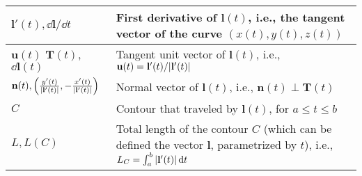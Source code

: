 \begin{xltabular}{\textwidth}{XX}
	\(\mathbf{l}'(t), \dd{\mathbf{l}}/\dd{t}\)                                                                                                                                                                                                 & First derivative of \(\mathbf{l}(t)\), i.e., the tangent vector of the curve \((x(t), y(t), z(t))\) \cite{stewartCalculus2011}                                                                                                                                                                                                      \\ \hline
	\(\mathbf{u}(t)\)\cite{kreyszigAdvancedEngineeringMathematics2008} \(\mathbf{T}(t)\)\cite{stewartCalculus2011}, \(\dd{\mathbf{l}}(t)\)\cite{ramoFieldsWavesCommunication1994}                                                                   & Tangent unit vector of \(\mathbf{l}(t)\), i.e., \newline  \(\mathbf{u}(t) = \mathbf{l}'(t)/\abs{\mathbf{l}'(t)}\) \\ \hline
	\(\mathbf{n}(t), \left( \frac{y'(t)}{\abs{\mathbf{l}'(t)}}, -\frac{x'(t)}{\abs{\mathbf{l}'(t)}} \right)\)                                                                                                                                  & Normal vector of \(\mathbf{l}(t)\), i.e., \newline \(\mathbf{n}(t)\perp \mathbf{T}(t) \)\cite{stewartCalculus2011}                                                                                                                                                                                                                  \\ \hline
	\(C\)                                                                                                                                                                                                                                      & Contour that traveled by \(\mathbf{l}(t)\), for \(a \leq t \leq b\) \cite{stewartCalculus2011}                                                                                                                                                                                                                                      \\ \hline
	\(L, L(C)\)                                                                                                                                                                                                                                & Total length of the contour \(C\) (which can be defined the vector \(\mathbf{l}\), parametrized by \(t\)), i.e., \(L_C = \int_a^b \abs{\mathbf{l}'(t)} \dd{t}\)\cite{stewartCalculus2011}                                                                                                                                           \\ \hline

\end{xltabular}
